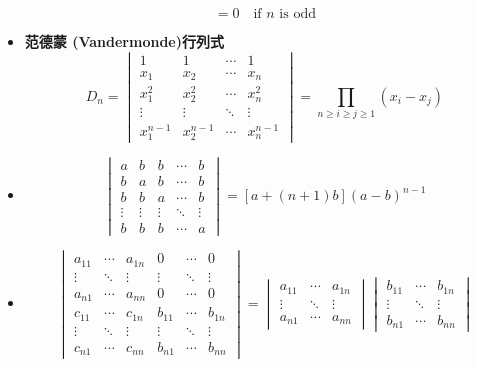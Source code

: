 \documentclass[UTF8]{ctexart}
\begin{document}
\begin{itemize}
\[= 0\quad \text{if }n\text{ is odd}\]
  \item \textbf{范德蒙 (Vandermonde)行列式}
  \[D_n=\begin{vmatrix}
  1&1&\cdots&1\\
  x_1&x_2&\cdots&x_n\\
  x_1^2&x_2^2&\cdots&x_n^2\\
  \vdots&\vdots&\ddots&\vdots\\
  x_1^{n-1}&x_2^{n-1}&\cdots&x_n^{n-1}
  \end{vmatrix}
  =\prod_{n\ge i\ge j\ge1}(x_i-x_j)
  \]
  \item
  \[
  \begin{vmatrix}
  a&b&b&\cdots&b\\
  b&a&b&\cdots&b\\
  b&b&a&\cdots&b\\
  \vdots&\vdots&\vdots&\ddots&\vdots\\
  b&b&b&\cdots&a
\end{vmatrix}=[a+(n+1)b](a-b)^{n-1}
  \]
  \item
  \[
  \begin{vmatrix}
    a_{11}&\cdots&a_{1n}&0&\cdots&0\\
    \vdots&\ddots&\vdots&\vdots&\ddots&\vdots\\
    a_{n1}&\cdots&a_{nn}&0&\cdots&0\\
    c_{11}&\cdots&c_{1n}&b_{11}&\cdots&b_{1n}\\
    \vdots&\ddots&\vdots&\vdots&\ddots&\vdots\\
    c_{n1}&\cdots&c_{nn}&b_{n1}&\cdots&b_{nn}
  \end{vmatrix}=\begin{vmatrix}
  a_{11}&\cdots&a_{1n}\\
  \vdots&\ddots&\vdots\\
  a_{n1}&\cdots&a_{nn}
  \end{vmatrix}\begin{vmatrix}
  b_{11}&\cdots&b_{1n}\\
  \vdots&\ddots&\vdots\\
  b_{n1}&\cdots&b_{nn}
  \end{vmatrix}
  \]
\end{itemize}
\end{document}
